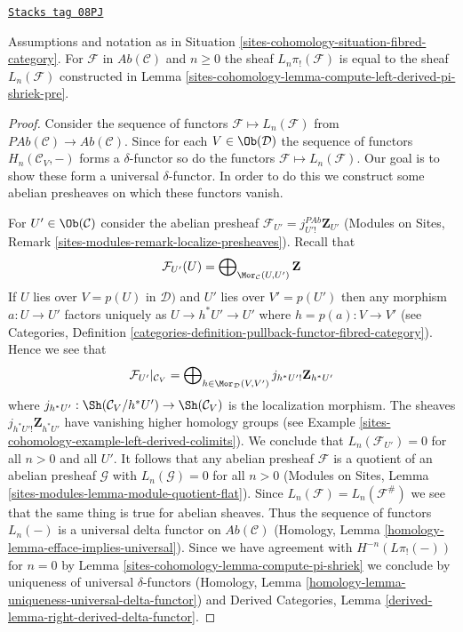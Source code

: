 \begin{lemma}
\label{sites-cohomology-lemma-compute-left-derived-pi-shriek}
\href{https://stacks.math.columbia.edu/tag/08PJ}{\texttt{Stacks tag 08PJ}}

Assumptions and notation as in Situation \ref{sites-cohomology-situation-fibred-category}.
For $\mathcal{F}$ in $\textit{Ab}(\mathcal{C})$ and $n \geq 0$
the sheaf $L_n\pi_!(\mathcal{F})$ is equal to the sheaf
$L_n(\mathcal{F})$ constructed in
Lemma \ref{sites-cohomology-lemma-compute-left-derived-pi-shriek-pre}.
\end{lemma}

\begin{proof}
Consider the sequence of functors $\mathcal{F} \mapsto L_n(\mathcal{F})$
from $\textit{PAb}(\mathcal{C}) \to \textit{Ab}(\mathcal{C})$.
Since for each $V \in \Ob(\mathcal{D})$ the sequence of functors
$H_n(\mathcal{C}_V, - )$ forms a $\delta$-functor
so do the functors $\mathcal{F} \mapsto L_n(\mathcal{F})$.
Our goal is to show these form a universal $\delta$-functor.
In order to do this we construct some abelian presheaves
on which these functors vanish.

\medskip\noindent
For $U' \in \Ob(\mathcal{C})$ consider the abelian presheaf
$\mathcal{F}_{U'} = j_{U'!}^{\textit{PAb}}\mathbf{Z}_{U'}$
(Modules on Sites, Remark \ref{sites-modules-remark-localize-presheaves}).
Recall that
$$
\mathcal{F}_{U'}(U) =
\bigoplus\nolimits_{\Mor_\mathcal{C}(U, U')} \mathbf{Z}
$$
If $U$ lies over $V = p(U)$ in $\mathcal{D})$ and $U'$ lies over $V' = p(U')$
then any morphism $a : U \to U'$ factors uniquely as $U \to h^*U' \to U'$
where $h = p(a) : V \to V'$ (see
Categories, Definition
\ref{categories-definition-pullback-functor-fibred-category}).
Hence we see that
$$
\mathcal{F}_{U'}|_{\mathcal{C}_V}
=
\bigoplus\nolimits_{h \in \Mor_\mathcal{D}(V, V')}
j_{h^*U'!}\mathbf{Z}_{h^*U'}
$$
where $j_{h^*U'} : \Sh(\mathcal{C}_V/h^*U') \to \Sh(\mathcal{C}_V)$
is the localization morphism. The sheaves $j_{h^*U'!}\mathbf{Z}_{h^*U'}$
have vanishing higher homology groups (see
Example \ref{sites-cohomology-example-left-derived-colimits}).
We conclude that $L_n(\mathcal{F}_{U'}) = 0$ for all $n > 0$ and all $U'$.
It follows that any abelian presheaf $\mathcal{F}$ is a quotient
of an abelian presheaf $\mathcal{G}$ with $L_n(\mathcal{G}) = 0$ for
all $n > 0$ (Modules on Sites, Lemma
\ref{sites-modules-lemma-module-quotient-flat}).
Since $L_n(\mathcal{F}) = L_n(\mathcal{F}^\#)$ we see
that the same thing is true for abelian sheaves. Thus
the sequence of functors $L_n(-)$ is a universal delta functor
on $\textit{Ab}(\mathcal{C})$
(Homology, Lemma \ref{homology-lemma-efface-implies-universal}).
Since we have agreement with
$H^{-n}(L\pi_!(-))$ for $n = 0$ by
Lemma \ref{sites-cohomology-lemma-compute-pi-shriek}
we conclude by uniqueness of universal $\delta$-functors
(Homology, Lemma \ref{homology-lemma-uniqueness-universal-delta-functor})
and
Derived Categories, Lemma \ref{derived-lemma-right-derived-delta-functor}.
\end{proof}

